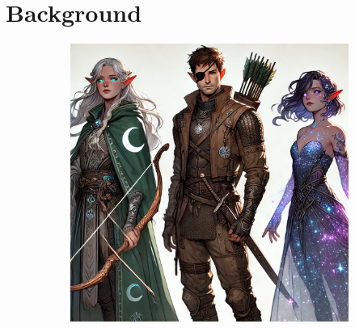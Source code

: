 \section{Background}\label{sec:background}

\begin{figure}[t]
    \centering

    \begin{subfigure}[t]{\textwidth}
        \centering
        \begin{minipage}[t]{0.3\textwidth}
            \centering
            \includegraphics[width=\linewidth]{resources/characters_old}
            \label{fig:char-old-all}
        \end{minipage}
        \hspace{0.01\textwidth}
        \begin{minipage}[t]{0.3\textwidth}
            \centering

\end{minipage}
\end{subfigure}
\end{figure}
